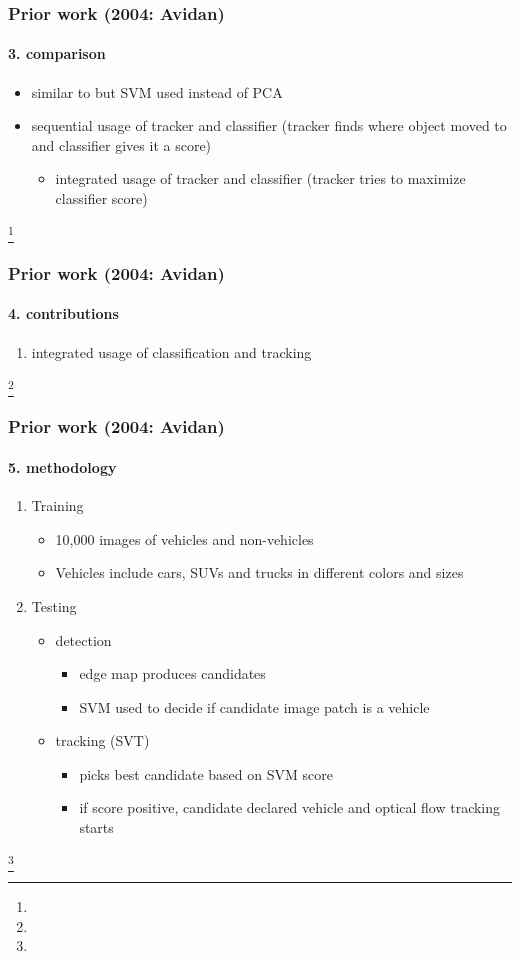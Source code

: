 \begin{frame}
\frametitle{Prior work (2004: Avidan)}
\framesubtitle{3. comparison}
\logoCSIPCPL\mypagenum		
	\begin{itemize}
		\item similar to  but SVM used instead of PCA
		\item sequential usage of tracker and classifier (tracker finds where object moved to and classifier gives it a score)	
			\begin{itemize}
				 \item integrated usage of tracker and classifier (tracker tries to maximize classifier score)
			\end{itemize}
	\end{itemize}
\footnote{\tiny {}}
\end{frame}


\begin{frame}
\frametitle{Prior work (2004: Avidan)}
\framesubtitle{4. contributions}
\logoCSIPCPL\mypagenum		
	\begin{enumerate}
		\item integrated usage of classification and tracking
	\end{enumerate}
\footnote{\tiny {}}
\end{frame}



\begin{frame}
\frametitle{Prior work (2004: Avidan)}
\framesubtitle{5. methodology}
\logoCSIPCPL\mypagenum		
	\begin{enumerate}
		\item Training
			\begin{itemize}
				\item 10,000 images of vehicles and non-vehicles
				\item Vehicles include cars, SUVs and trucks in different colors and sizes
			\end{itemize}
		\item Testing
			\begin{itemize}
				\item detection
					\begin{itemize}
						\item edge map produces candidates
						\item SVM used to decide if candidate image patch is a vehicle
					\end{itemize}
				\item tracking (SVT)
					\begin{itemize}
						\item picks best candidate based on SVM score
						\item if score positive, candidate declared vehicle and optical flow tracking starts
					\end{itemize}
			\end{itemize}		
	\end{enumerate}
\footnote{\tiny {}}
\end{frame}


